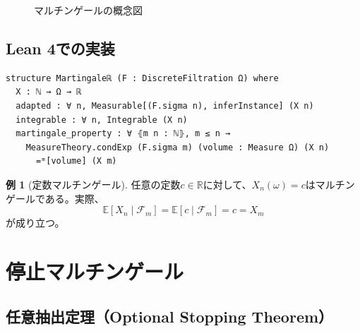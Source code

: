 \documentclass[a4paper,11pt]{ltjsarticle}
\theoremstyle{definition}
\newtheorem{example}[definition]{例}
\begin{document}
\begin{figure}[h]
\centering
{}
\caption{マルチンゲールの概念図}
\label{fig:martingale}
\end{figure}

\subsection{Lean 4での実装}

\begin{lstlisting}[style=leanstyle,language=ML,caption={Martingaleℝの定義}]
structure Martingaleℝ (F : DiscreteFiltration Ω) where
  X : ℕ → Ω → ℝ
  adapted : ∀ n, Measurable[(F.sigma n), inferInstance] (X n)
  integrable : ∀ n, Integrable (X n)
  martingale_property : ∀ ⦃m n : ℕ⦄, m ≤ n →
    MeasureTheory.condExp (F.sigma m) (volume : Measure Ω) (X n)
      =ᵐ[volume] (X m)
\end{lstlisting}

\begin{example}[定数マルチンゲール]
任意の定数$c \in \mathbb{R}$に対して、$X_n(\omega) = c$はマルチンゲールである。実際、
\[
\mathbb{E}[X_n \mid \mathcal{F}_m] = \mathbb{E}[c \mid \mathcal{F}_m] = c = X_m
\]
が成り立つ。
\end{example}

\section{停止マルチンゲール}

\subsection{任意抽出定理（Optional Stopping Theorem）}
\end{document}
